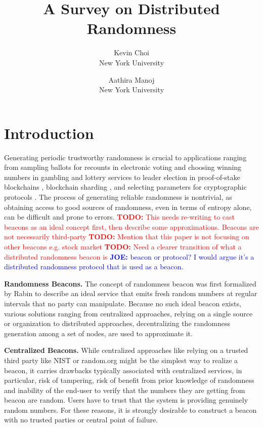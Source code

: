 \documentclass[letterpaper,twocolumn,10pt]{article}
\title{\Large \bf A Survey on Distributed Randomness}
\author{
{\rm Kevin Choi}\\
New York University
\and
{\rm Aathira Manoj}\\
New York University
}
\theoremstyle{definition}
\theoremstyle{remark}
\newcommand{\todo}[1]{\textcolor{red}{\textbf{TODO:} #1}}
\newcommand{\joenote}[1]{\textcolor{blue}{\textbf{JOE:} #1}}
\begin{document}
\maketitle
\tableofcontents

\section{Introduction}
Generating periodic trustworthy randomness is crucial to applications ranging from sampling ballots for recounts in electronic voting \cite{adida2008helios} and choosing winning numbers in gambling and lottery services \cite{bonneau2015bitcoin} to leader election in proof-of-stake blockchains \cite{gilad2017algorand, kiayias2017ouroboros}, blockchain sharding \cite{al2017chainspace, kokoris2018omniledger, luu2016secure}, and selecting parameters for cryptographic protocols \cite{baigneres2015trap, lenstra2015random}. The process of generating reliable randomness is nontrivial, as obtaining access to good sources of randomness, even in terms of entropy alone, can be difficult and prone to errors.
\todo{This needs re-writing to cast beacons as an ideal concept first, then describe some approximations. Beacons are not necessarily third-party}
\todo{Mention that this paper is not focusing on other beacons e.g. stock market}
\todo{Need a clearer transition of what a distributed randomness beacon is} \joenote{beacon or protocol? I would argue it's a distributed randomness protocol that is used as a beacon.}

\textbf{Randomness Beacons.} The concept of randomness beacon was first formalized by Rabin \cite{rabin1983Rabin} to describe an ideal service that emits fresh random numbers at regular intervals that no party can manipulate. Because no such ideal beacon exists, various solutions ranging from  centralized approaches, relying on a single source or organization to distributed approaches, decentralizing the randomness generation among a set of nodes, are used to approximate it. 

\textbf{Centralized Beacons.} While centralized approaches like relying on a trusted third party like NIST \cite{fischer2011public} or random.org \cite{haahr2010random} might be the simplest way to realize a beacon, it carries drawbacks typically associated with centralized services, in particular, risk of tampering, risk of benefit from prior knowledge of randomness and inability of the end-user to verify that the numbers they are getting from beacon are random. Users have to trust that the system is providing genuinely random numbers. For these reasons, it is strongly desirable to construct a beacon with no trusted parties or central point of failure.
\end{document}
